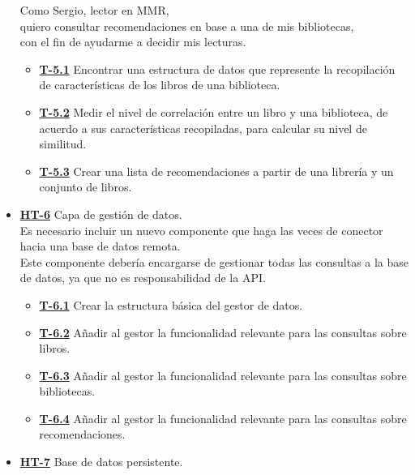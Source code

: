 \begin{itemize}
    Como Sergio, lector en MMR, \\
    quiero consultar recomendaciones en base a una de mis bibliotecas, \\
    con el fin de ayudarme a decidir mis lecturas.
    \begin{itemize}
        \item \href{https://github.com/Anglepi/My-Many-Reads/issues/66}{\textbf{T-5.1}} Encontrar una estructura de datos que represente la recopilación de características de los libros de una biblioteca.
        \item \href{https://github.com/Anglepi/My-Many-Reads/issues/67}{\textbf{T-5.2}} Medir el nivel de correlación entre un libro y una biblioteca, de acuerdo a sus características recopiladas, para calcular su nivel de similitud.
        \item \href{https://github.com/Anglepi/My-Many-Reads/issues/68}{\textbf{T-5.3}} Crear una lista de recomendaciones a partir de una librería y un conjunto de libros.
    \end{itemize}
    \item \href{https://github.com/Anglepi/My-Many-Reads/issues/76}{\textbf{HT-6}} Capa de gestión de datos. \\
    Es necesario incluir un nuevo componente que haga las veces de conector hacia una base de datos remota. \\
    Este componente debería encargarse de gestionar todas las consultas a la base de datos, ya que no es responsabilidad de la API.
    \begin{itemize}
        \item \href{https://github.com/Anglepi/My-Many-Reads/issues/77}{\textbf{T-6.1}} Crear la estructura básica del gestor de datos.
        \item \href{https://github.com/Anglepi/My-Many-Reads/issues/78}{\textbf{T-6.2}} Añadir al gestor la funcionalidad relevante para las consultas sobre libros.
        \item \href{https://github.com/Anglepi/My-Many-Reads/issues/79}{\textbf{T-6.3}} Añadir al gestor la funcionalidad relevante para las consultas sobre bibliotecas.
        \item \href{https://github.com/Anglepi/My-Many-Reads/issues/80}{\textbf{T-6.4}} Añadir al gestor la funcionalidad relevante para las consultas sobre recomendaciones.
    \end{itemize}
    \item \href{https://github.com/Anglepi/My-Many-Reads/issues/76}{\textbf{HT-7}} Base de datos persistente. \\

\end{itemize}
